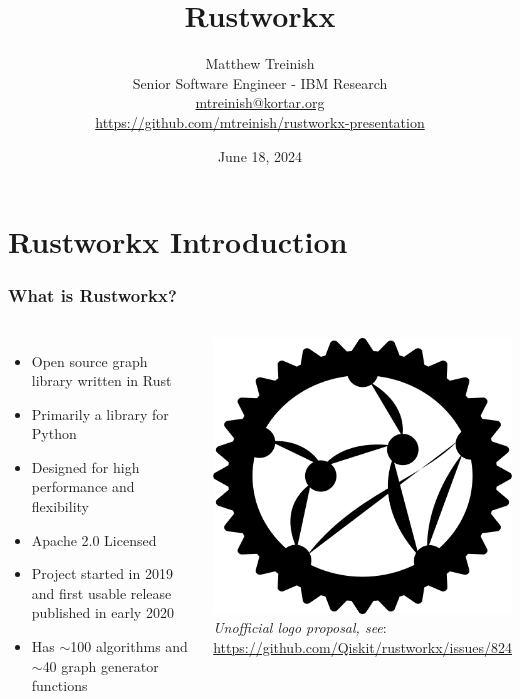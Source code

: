 \documentclass[aspectratio=169,11pt,hyperref={colorlinks=true}]{beamer}
\author[Matthew Treinish]{%
    \texorpdfstring{%
        \centering
        Matthew Treinish\\
        Senior Software Engineer - IBM Research\\
        \href{mailto:mtreinish@kortar.org}{mtreinish@kortar.org}\\
        \href{https://github.com/mtreinish/rustworkx-presentation}{https://github.com/mtreinish/rustworkx-presentation}
   }
   {Matthew Treinish}
}
\date{June 18, 2024}
\title{Rustworkx}
\begin{document}
\titlepage
\section{Rustworkx Introduction}
\begin{frame}
    \frametitle{What is Rustworkx?}
    \begin{columns}
            \begin{itemize}
                \item Open source graph library written in Rust
                \item Primarily a library for Python
                \item Designed for high performance and flexibility
                \item Apache 2.0 Licensed
                \item Project started in 2019 and first usable release published in early 2020
                \item Has $\sim$100 algorithms and $\sim$40 graph generator functions
            \end{itemize}
            \centering
            \includegraphics[width=.8\textwidth]{rustworkx_logo.png}\\
            \footnotesize
            \textit{Unofficial logo proposal, see}:\\ \href{https://github.com/Qiskit/rustworkx/issues/824}{https://github.com/Qiskit/rustworkx/issues/824}
    \end{columns}
\end{frame}
\end{document}
